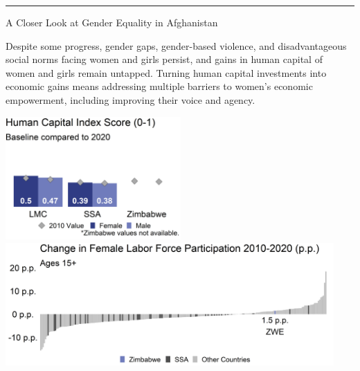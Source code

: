 \documentclass[
]{article}
\begin{document}
\vspace{.3cm}

\centering\rule{19.5cm}{0.5pt}

\vspace{.3cm}

\begin{minipage}[c][1.65cm][t]{19.5cm}
\begin{minipage}[c][1.65cm][t]{6cm}
\begin{spacing}{2}\fontsize{14}{1}\selectfont   
A Closer Look at Gender Equality in Afghanistan
\normalsize
\end{spacing}\end{minipage}\hspace{0.5cm}
\begin{minipage}[c][1.65cm][t]{12.75cm}
\fontsize{9}{8}\selectfont   
Despite some progress, gender gaps, gender-based violence, and disadvantageous social norms facing women and girls persist, and gains in human capital of women and girls remain untapped. Turning human capital investments into economic gains means addressing multiple barriers to women’s economic empowerment, including improving their voice and agency.
\normalsize
\end{minipage}
\end{minipage}

\vspace{.15cm}

\begin{minipage}[t][4.7cm][t]{19.5cm}
\href{https://genderdata.worldbank.org/indicators/hd-hci-ovrl}{\includegraphics[height=4.7cm]{HCIplot.png}}\hspace{.2cm}
\href{https://genderdata.worldbank.org/indicators/sl-tlf-acti-zs/}{\includegraphics[height=4.7cm]{LFPplot.png}}  
\end{minipage}
\end{document}
